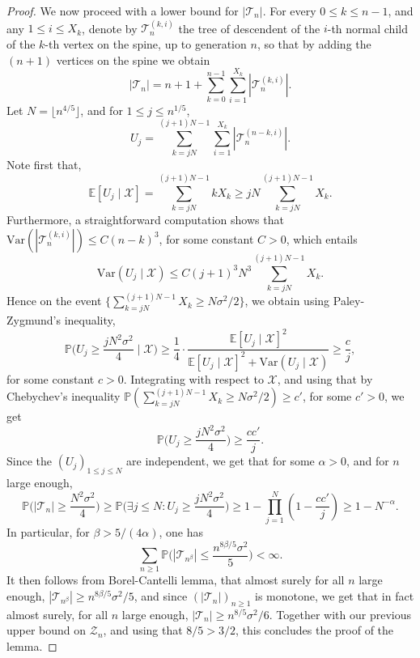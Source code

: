 \documentclass[10pt,a4paper]{amsart}
\newcommand{\1}{{\text{\Large $\mathfrak 1$}}}
\begin{document}
\begin{proof}
We now proceed with a lower bound for $|\mathcal T_n|$. For every $0\le k\le n-1$, and any $1\le i\le X_k$, denote by $\mathcal T^{(k,i)}_n$ the tree of descendent of the $i$-th
normal child of the $k$-th vertex on the spine, up to generation $n$, so that by adding the $(n+1)$ vertices on the spine we obtain
$$|\mathcal T_n| =n+1+ \sum_{k=0}^{n-1} \sum_{i=1}^{X_k} |\mathcal T^{(k,i)}_n|. $$ 
Let $N = \lfloor n^{4/5}\rfloor$,  and for $1\le j\le n^{1/5}$,  
$$U_j = \sum_{k = jN}^{(j+1)N - 1}  \sum_{i = 1}^{X_k}  |\mathcal T^{(n-k,i)}_n|. $$ 
Note first that, 
$$\mathbb E[U_j\mid \mathcal X] =  \sum_{k = jN}^{(j+1)N - 1} kX_k\ge jN\sum_{k=jN}^{(j+1)N - 1} X_k.$$
Furthermore, a straightforward computation shows that $\text{Var}(|\mathcal T^{(k,i)}_n|) \le C(n-k)^3$, for some constant $C>0$, which entails 
$$\text{Var}(U_j \mid \mathcal X) \le C(j+1)^3N^3 \sum_{k = jN}^{(j+1)N - 1} X_k. $$  
Hence on the event $\big\{ \sum_{k = jN}^{(j+1)N - 1} X_k \ge N \sigma^2 / 2\big\}$, we obtain using Paley-Zygmund's inequality, 
$$\mathbb P\Big(U_j \ge \frac{jN^2\sigma^2}{4} \mid \mathcal X\Big)  \ge \frac 14 \cdot \frac{ \mathbb E[U_j\mid \mathcal X]^2}{ \mathbb E[U_j\mid \mathcal X]^2 + 
\text{Var}(U_j\mid \mathcal X)} \ge \frac{c}{j}, $$
for some constant $c>0$. Integrating with respect to $\mathcal X$, and using that by Chebychev's inequality $\mathbb P(\sum_{k = jN}^{(j+1)N - 1} X_k \ge N \sigma^2 / 2) \ge c'$, for some $c'>0$, we get 
$$\mathbb P\big(U_j \ge \frac{jN^2\sigma^2}{4}\big)\ge \frac{cc'}{j}. $$ 
Since the $(U_j)_{1\le j\le N}$ are independent, we get that for some $\alpha>0$, and for $n$ large enough, 
$$\mathbb P\big(|\mathcal T_n|\ge \frac{N^2\sigma^2}4\big)\ge  \mathbb P\Big(\exists j\le N : U_j \ge \frac{jN^2\sigma^2}{4}\Big) \ge 1 - \prod_{j=1}^N (1- \frac{cc'}{j}) \ge 1 - N^{-\alpha}. $$ 
In particular, for $\beta>5/(4\alpha)$, one has 
$$\sum_{n\ge 1} \mathbb P\big(|\mathcal T_{n^\beta}| \leq \frac{n^{8\beta/5} \sigma^2}{5}\big)<\infty. $$ 
It then follows from Borel-Cantelli lemma, that almost surely for all $n$ large enough, 
$|\mathcal T_{n^\beta}|\ge n^{8\beta/5} \sigma^2/5$, and since $(|\mathcal T_n|)_{n\ge 1}$ is monotone, we get that in fact almost surely, for all $n$ large enough, 
$|\mathcal T_n|\ge n^{8/5} \sigma^2/6$. Together with our previous upper bound on $\mathcal Z_n$, and using that $8/5 > 3/2$, this concludes the proof of the lemma. 
\end{proof}

\end{document}
